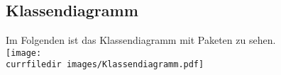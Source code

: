 \begin{samepage}
    \subsection{Klassendiagramm}
    Im Folgenden ist das Klassendiagramm mit Paketen zu sehen.\\
    \texttt{[image: \\currfiledir images/Klassendiagramm.pdf]}

\end{samepage}